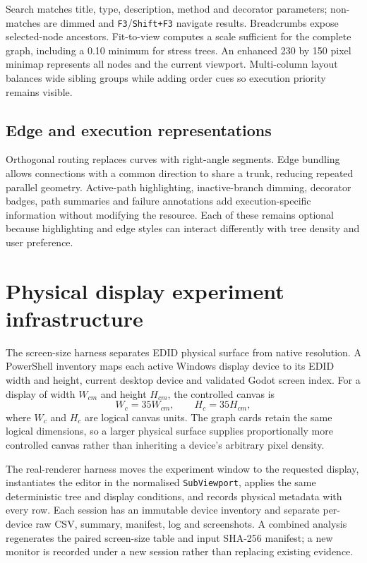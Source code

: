 Search matches title, type, description, method and decorator parameters; non-matches are dimmed and \texttt{F3}/\texttt{Shift+F3} navigate results. Breadcrumbs expose selected-node ancestors. Fit-to-view computes a scale sufficient for the complete graph, including a 0.10 minimum for stress trees. An enhanced 230 by 150 pixel minimap represents all nodes and the current viewport. Multi-column layout balances wide sibling groups while adding order cues so execution priority remains visible.

\subsection{Edge and execution representations}

Orthogonal routing replaces curves with right-angle segments. Edge bundling allows connections with a common direction to share a trunk, reducing repeated parallel geometry. Active-path highlighting, inactive-branch dimming, decorator badges, path summaries and failure annotations add execution-specific information without modifying the resource. Each of these remains optional because highlighting and edge styles can interact differently with tree density and user preference.

\section{Physical display experiment infrastructure}

The screen-size harness separates EDID physical surface from native resolution. A PowerShell inventory maps each active Windows display device to its EDID width and height, current desktop device and validated Godot screen index. For a display of width \(W_{cm}\) and height \(H_{cm}\), the controlled canvas is
\[
W_c=35W_{cm}, \qquad H_c=35H_{cm},
\]
where \(W_c\) and \(H_c\) are logical canvas units. The graph cards retain the same logical dimensions, so a larger physical surface supplies proportionally more controlled canvas rather than inheriting a device's arbitrary pixel density.

The real-renderer harness moves the experiment window to the requested display, instantiates the editor in the normalised \texttt{SubViewport}, applies the same deterministic tree and display conditions, and records physical metadata with every row. Each session has an immutable device inventory and separate per-device raw CSV, summary, manifest, log and screenshots. A combined analysis regenerates the paired screen-size table and input SHA-256 manifest; a new monitor is recorded under a new session rather than replacing existing evidence.

